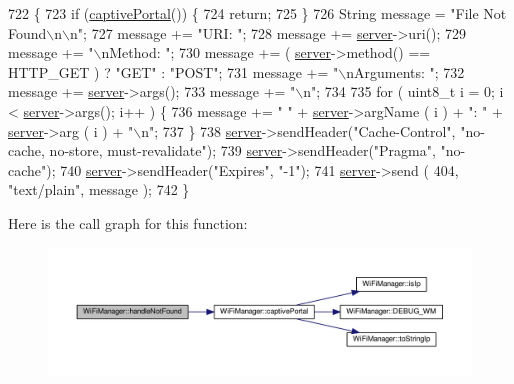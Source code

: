\begin{DoxyCode}
722                                  \{
723   \textcolor{keywordflow}{if} (\hyperlink{class_wi_fi_manager_a4ef4298deb224212e5242c456669a973}{captivePortal}()) \{
724         \textcolor{keywordflow}{return};
725   \}
726   String message = \textcolor{stringliteral}{"File Not Found\(\backslash\)n\(\backslash\)n"};
727   message += \textcolor{stringliteral}{"URI: "};
728   message += \hyperlink{class_wi_fi_manager_a509523a01c0395cf0dc235b074f2a5ea}{server}->uri();
729   message += \textcolor{stringliteral}{"\(\backslash\)nMethod: "};
730   message += ( \hyperlink{class_wi_fi_manager_a509523a01c0395cf0dc235b074f2a5ea}{server}->method() == HTTP\_GET ) ? \textcolor{stringliteral}{"GET"} : \textcolor{stringliteral}{"POST"};
731   message += \textcolor{stringliteral}{"\(\backslash\)nArguments: "};
732   message += \hyperlink{class_wi_fi_manager_a509523a01c0395cf0dc235b074f2a5ea}{server}->args();
733   message += \textcolor{stringliteral}{"\(\backslash\)n"};
734 
735   \textcolor{keywordflow}{for} ( uint8\_t i = 0; i < \hyperlink{class_wi_fi_manager_a509523a01c0395cf0dc235b074f2a5ea}{server}->args(); i++ ) \{
736     message += \textcolor{stringliteral}{" "} + \hyperlink{class_wi_fi_manager_a509523a01c0395cf0dc235b074f2a5ea}{server}->argName ( i ) + \textcolor{stringliteral}{": "} + \hyperlink{class_wi_fi_manager_a509523a01c0395cf0dc235b074f2a5ea}{server}->arg ( i ) + \textcolor{stringliteral}{"\(\backslash\)n"};
737   \}
738   \hyperlink{class_wi_fi_manager_a509523a01c0395cf0dc235b074f2a5ea}{server}->sendHeader(\textcolor{stringliteral}{"Cache-Control"}, \textcolor{stringliteral}{"no-cache, no-store, must-revalidate"});
739   \hyperlink{class_wi_fi_manager_a509523a01c0395cf0dc235b074f2a5ea}{server}->sendHeader(\textcolor{stringliteral}{"Pragma"}, \textcolor{stringliteral}{"no-cache"});
740   \hyperlink{class_wi_fi_manager_a509523a01c0395cf0dc235b074f2a5ea}{server}->sendHeader(\textcolor{stringliteral}{"Expires"}, \textcolor{stringliteral}{"-1"});
741   \hyperlink{class_wi_fi_manager_a509523a01c0395cf0dc235b074f2a5ea}{server}->send ( 404, \textcolor{stringliteral}{"text/plain"}, message );
742 \}
\end{DoxyCode}
Here is the call graph for this function\+:\nopagebreak
\begin{figure}[H]
\begin{center}
\leavevmode
\includegraphics[width=350pt]{d4/dc8/class_wi_fi_manager_a7d01f7de3e4b76acdabffac79fa3d0ab_cgraph}
\end{center}
\end{figure}

